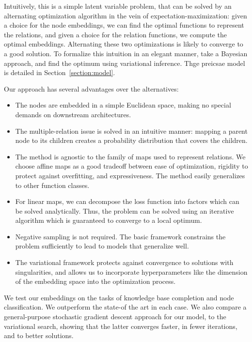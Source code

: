 \documentclass[11pt]{article}
\begin{document}
Intuitively, this is a simple latent variable problem, that can be solved by an alternating optimization algorithm in the vein of expectation-maximization: given a choice for the node embeddings, we can find the optimal functions to represent the relations, and given a choice for the relation functions, we compute the optimal embeddings. Alternating these two optimizations is likely to converge to a good solution. To formalize this intuition in an elegant manner, take a Bayesian approach, and find the optimum using variational inference. Thge preicsae model is detailed in Section~\ref{section:model}.

Our approach has several advantages over the alternatives:
\begin{itemize}
	\item The nodes are embedded in a simple Euclidean space, making no special demands on downstream architectures.
	\item The multiple-relation issue is solved in an intuitive manner: mapping a parent node to its children creates a probability distribution that covers the children. 
	\item The method is agnostic to the family of maps used to represent relations. We choose affine maps as a good tradeoff between ease of optimization, rigidity to protect against overfitting, and expressiveness. The method easily generalizes to other function classes.
	\item For linear maps, we can decompose the loss function into factors which can be solved analytically. Thus, the problem can be solved using an iterative algorithm which is guaranteed to converge to a local optimum.
	\item Negative sampling is not required. The basic framework constrains the problem sufficiently to lead to models that generalize well.
	\item The variational framework protects against convergence to solutions with singularities, and allows us to incorporate hyperparameters like the dimension of the embedding space into the optimization process.
\end{itemize}

We test our embeddings on the tasks of knowledge base completion and node classification. We outperform the state-of the art in each case. We also compare a general-purpose stochastic gradient descent approach for our model, to the variational search, showing that the latter converges faster, in fewer iterations, and to better solutions.
\end{document}
